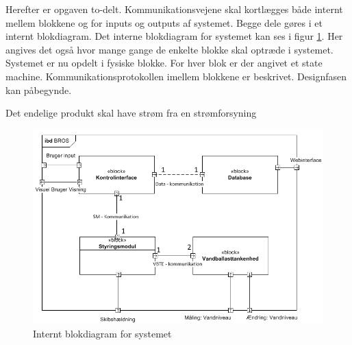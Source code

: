 Herefter er opgaven to-delt. Kommunikationsvejene skal kortlægges både internt mellem blokkene og for inputs og outputs af systemet. Begge dele gøres i et internt blokdiagram. Det interne blokdiagram for systemet kan ses i figur \ref{fig:idb_bros}. Her angives det også hvor mange gange de enkelte blokke skal optræde i systemet.\\

Systemet er nu opdelt i fysiske blokke. For hver blok er der angivet et state machine. Kommunikationsprotokollen imellem blokkene er beskrivet. Designfasen kan påbegynde.

Det endelige produkt skal have strøm fra en strømforsyning \fxnote

\begin{figure}[htbp]
\centering
\includegraphics[scale=0.8]{billeder/Systemarkitektur/ibd_bros}
\caption{Internt blokdiagram for systemet}
\label{fig:idb_bros}
\end{figure}

